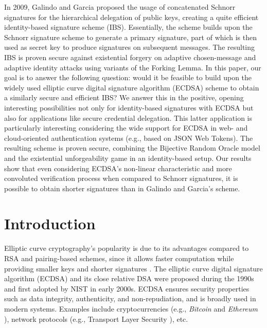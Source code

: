 \documentclass[version=submission, floatrow]{iacrcc}
\begin{document}
\begin{textabstract}
In 2009, Galindo and Garcia proposed the usage of concatenated Schnorr signatures for the hierarchical delegation of public keys, creating a quite efficient identity-based signature scheme (IBS).
%
Essentially, the scheme builds upon the Schnorr signature scheme to generate a primary signature, part of which is then used as secret key to produce signatures on subsequent messages.
%
The resulting IBS is proven secure against existential forgery on adaptive chosen-message and adaptive identity attacks using variants of the Forking Lemma. 
%
In this paper, our goal is to answer the following question: would it be feasible to build upon the widely used elliptic curve digital signature algorithm (ECDSA) scheme to obtain a similarly secure and efficient IBS?
%
We answer this in the positive, opening interesting possibilities not only for identity-based signatures with ECDSA but also for applications like secure credential delegation.
%
This latter application is particularly interesting considering the wide support for ECDSA in web- and cloud-oriented authentication systems (e.g., based on JSON Web Tokens).
%
The resulting scheme is proven secure, combining the Bijective Random Oracle model and the existential unforgeability game in an identity-based setup. 
%
Our results show that even considering ECDSA's non-linear characteristic and more convoluted verification process when compared to Schnorr signatures, it is possible to obtain shorter signatures than in Galindo and Garcia's scheme.
\end{textabstract}

\section{Introduction}

Elliptic curve cryptography's popularity is due to its advantages compared to RSA \cite{Rivest1978} and pairing-based schemes, since it allows faster computation while providing smaller keys and shorter signatures \cite{Lenstra2001}. 
%
The elliptic curve digital signature algorithm (ECDSA) \cite{FIPS186-5} and its close relative DSA were proposed during the 1990s and first adopted by NIST in early 2000s.
%
ECDSA ensures security properties such as data integrity, authenticity, and non-repudiation, and is broadly used in modern systems. 
%
Examples include cryptocurrencies (e.g., \textit{Bitcoin} \cite{Nakamoto2008} and \textit{Ethereum} \cite{Ethereum}), network protocols (e.g., Transport Layer Security \cite{rfc8446}), etc.
\end{document}
